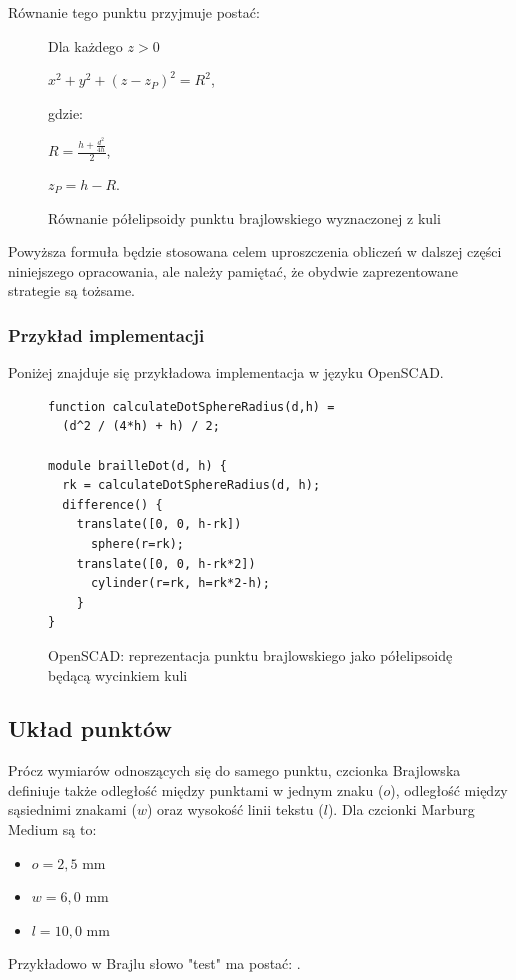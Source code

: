 \documentclass[12pt,a4paper]{article}
\begin{document}
Równanie tego punktu przyjmuje postać:

\begin{figure}
Dla każdego $z>0$

$x^2 + y^2 + (z - z_P)^2 = R^2$,

gdzie:

$R = \frac{h + \frac{d^2}{4h}}{2}$,

$z_P = h-R$.
\caption{Równanie półelipsoidy punktu brajlowskiego wyznaczonej z kuli}
\end{figure}

Powyższa formuła będzie stosowana celem uproszczenia obliczeń w dalszej części niniejszego opracowania, ale należy pamiętać, że obydwie zaprezentowane strategie są tożsame.

\subsubsection{Przykład implementacji}
Poniżej znajduje się przykładowa implementacja w języku OpenSCAD.

\begin{figure}
\begin{verbatim}
function calculateDotSphereRadius(d,h) = 
  (d^2 / (4*h) + h) / 2;

module brailleDot(d, h) {
  rk = calculateDotSphereRadius(d, h);
  difference() {
    translate([0, 0, h-rk])
      sphere(r=rk);
    translate([0, 0, h-rk*2])
      cylinder(r=rk, h=rk*2-h);
    }
}
\end{verbatim}
\caption{OpenSCAD: reprezentacja punktu brajlowskiego jako półelipsoidę będącą wycinkiem kuli}
\end{figure}

\subsection{Układ punktów}
Prócz wymiarów odnoszących się do samego punktu, czcionka Brajlowska definiuje także odległość między punktami w jednym znaku ($o$), odległość między sąsiednimi znakami ($w$) oraz wysokość linii tekstu ($l$).
Dla czcionki Marburg Medium są to:
\begin{itemize}
\item $o = 2{,}5 \text{ mm}$
\item $w = 6{,}0 \text{ mm}$
\item $l = 10{,}0 \text{ mm}$
\end{itemize}

Przykładowo w Brajlu słowo "test" ma postać: .
\end{document}
